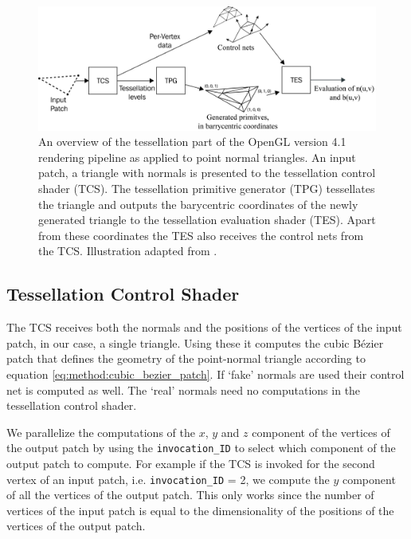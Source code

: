 	\begin{figure}
		\centering
		\includegraphics[width=\textwidth, height = 0.25\textheight, keepaspectratio]{content/img/implementation/tessellationPipeline-01.png}
		\caption{An overview of the tessellation part of the OpenGL version 4.1 rendering pipeline as applied to point normal triangles. An input patch, a triangle with normals is presented to the tessellation control shader (TCS). The tessellation primitive generator (TPG) tessellates the triangle and outputs the barycentric coordinates of the newly generated triangle to the tessellation evaluation shader (TES). Apart from these coordinates the TES also receives the control nets from the TCS. Illustration adapted from \cite{wolff2013opengl}.}
		\label{fig:implementation:tessellationPipeline}
	\end{figure}

\subsection{Tessellation Control Shader}
\label{ss:implementation:tcs}
	The TCS receives both the normals and the positions of the vertices of the input patch, in our case, a single triangle. 
		Using these it computes the cubic Bézier patch that defines the geometry of the point-normal triangle according to equation \eqref{eq:method:cubic_bezier_patch}.
		If `fake' normals are used their control net is computed as well. 
		The `real' normals need no computations in the tessellation control shader.

		We parallelize the computations of the $x$, $y$ and $z$ component of the vertices of the output patch by using the \texttt{invocation\_ID} to select which component of the output patch to compute. For example if the TCS is invoked for the second vertex of an input patch, i.e. \texttt{invocation\_ID} = 2, we compute the $y$ component of all the vertices of the output patch. This only works since the number of vertices of the input patch is equal to the dimensionality of the positions of the vertices of the output patch.

